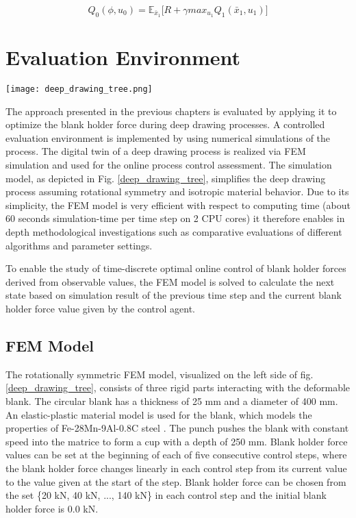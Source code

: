 \begin{equation}
\label{monte_carlo_update}
Q_0(\phi, u_0)=\mathbb{E}_{\bar{x}_1}\Big[R+\gamma max_{u_1}Q_1(\bar{x}_1, u_1)\Big]
\end{equation}

\section{Evaluation Environment}
\label{eval}
\begin{figure*}
	\texttt{[image: deep\_drawing\_tree.png]}
	\caption{left: Rotationally symmetric deep drawing simulation model with observable-values $o$ and actor-values $u$. right: tree-like manufacturing process MDP for a given friction coefficient of 0.056, with color coded von Mises stress distribution (unit: MPa) in the radial workpiece intersection.}
	\label{deep_drawing_tree}
\end{figure*}

The approach presented in the previous chapters is evaluated by applying it to optimize the blank holder force during deep drawing processes. A controlled evaluation environment is implemented by using numerical simulations of the process. The digital twin of a deep drawing process is realized via FEM simulation and used for the online process control assessment. The simulation model, as depicted in Fig. \ref{deep_drawing_tree}, simplifies the deep drawing process assuming rotational symmetry and isotropic material behavior. Due to its simplicity, the FEM model is very efficient with respect to computing time (about 60 seconds simulation-time per time step on 2 CPU cores) it therefore enables in depth methodological investigations such as comparative evaluations of different algorithms and parameter settings.

To enable the study of time-discrete optimal online control of blank holder forces derived from observable values, the FEM model is solved to calculate the next state based on simulation result of the previous time step and the current blank holder force value given by the control agent.

\subsection{FEM Model}
\label{femModel}
The rotationally symmetric FEM model, visualized on the left side of fig. \ref{deep_drawing_tree}, consists of three rigid parts interacting with the deformable blank. The circular blank has a thickness of 25 mm and a diameter of 400 mm. An elastic-plastic material model is used for the blank, which models the properties of Fe-28Mn-9Al-0.8C steel \cite{yoo2009}. The punch pushes the blank with constant speed into the matrice to form a cup with a depth of 250 mm. Blank holder force values can be set at the beginning of each of five consecutive control steps, where the blank holder force changes linearly in each control step from its current value to the value given at the start of the step. Blank holder force can be chosen from the set \{20 kN, 40 kN, ..., 140 kN\} in each control step and the initial blank holder force is 0.0 kN.

